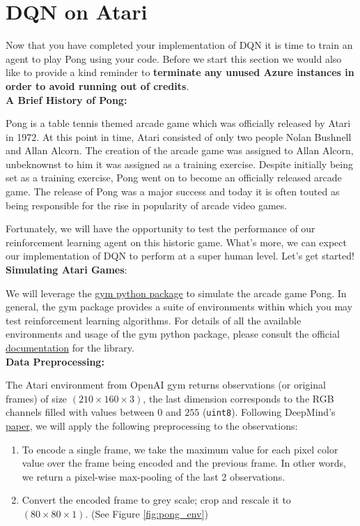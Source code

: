 \section{DQN on Atari}

Now that you have completed your implementation of DQN it is time to train an agent to play Pong using your code. Before we start this section we would also like to provide a kind reminder to \textbf{terminate any unused Azure instances in order to avoid running out of credits}. \\

\textbf{A Brief History of Pong:}

Pong is a table tennis themed arcade game which was officially released by Atari in 1972. At this point in time, Atari consisted of only two people Nolan Bushnell and Allan Alcorn. The creation of the arcade game was assigned to Allan Alcorn, unbeknownst to him it was assigned as a training exercise. Despite initially being set as a training exercise, Pong went on to become an officially released arcade game. The release of Pong was a major success and today it is often touted as being responsible for the rise in popularity of arcade video games.

Fortunately, we will have the opportunity to test the performance of our reinforcement learning agent on this historic game. What's more, we can expect our implementation of DQN to perform at a super human level. Let's get started! \\

\textbf{Simulating Atari Games}:

We will leverage the \href{https://www.gymlibrary.ml/}{gym python package} to simulate the arcade game Pong. In general, the gym package provides a suite of environments within which you may test reinforcement learning algorithms. For details of all the available environments and usage of the gym python package, please consult the official \href{https://www.gymlibrary.ml/}{documentation} for the library. \\

\textbf{Data Preprocessing:}

The Atari environment from OpenAI gym returns observations (or original frames) of size $ (210 \times 160 \times 3) $, the last dimension corresponds to the RGB channels filled with values between $ 0 $ and $ 255 $ (\texttt{uint8}). Following DeepMind's \href{https://storage.googleapis.com/deepmind-media/dqn/DQNNaturePaper.pdf}{paper}, we will apply the following preprocessing to the observations:
\begin{enumerate}[1.]
\item To encode a single frame, we take the maximum value for each pixel color value over the frame being encoded and the previous frame. In other words, we return a pixel-wise max-pooling of the last 2 observations.
\item Convert the encoded frame to grey scale; crop and rescale it to $(80 \times 80 \times 1)$. (See Figure \ref{fig:pong_env})
\end{enumerate}

